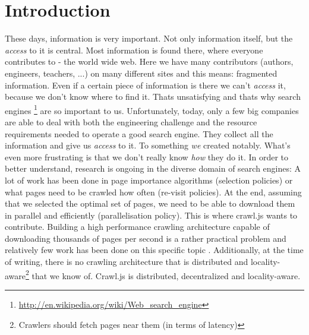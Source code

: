 
\chapter{Introduction} %

\label{Chapter1} %


These days, information is very important. Not only information itself, but the \emph{access} to it is central. Most information is found there, where everyone contributes to - the world wide web. Here we have many contributors (authors, engineers, teachers, ...) on many different sites and this means: fragmented information. Even if a certain piece of information is there we can't \emph{access} it, because we don't know where to find it. Thats unsatisfying and thats why search engines \footnote{\url{http://en.wikipedia.org/wiki/Web_search_engine}} are so important to us.
\newline
Unfortunately, today, only a few big companies are able to deal with both the engineering challenge and the resource requirements needed to operate a good search engine. They collect all the information and give us \emph{access} to it. To something \emph{we} created notably. What's even more frustrating is that we don't really know \emph{how} they do it. In order to better understand, research is ongoing in the diverse domain of search engines:
\newline
A lot of work has been done in page importance algorithms (selection policies) or what pages need to be crawled how often (re-visit policies)\cite{page_importance1}\cite{page_importance2}. At the end, assuming that we selected the optimal set of pages, we need to be able to download them in parallel and efficiently (parallelisation policy). This is where crawl.js wants to contribute. Building a high performance crawling architecture capable of downloading thousands of pages per second is a rather practical problem and relatively few work has been done on this specific topic \cite{ubicrawler}\cite{hp_crawler}. Additionally, at the time of writing, there is no crawling architecture that is distributed and locality-aware\footnote{Crawlers should fetch pages near them (in terms of latency)} that we know of.
\newline
Crawl.js is distributed, decentralized and locality-aware.

